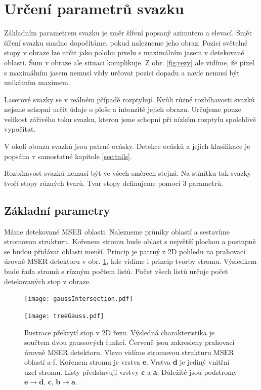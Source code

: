 \section{Určení parametrů svazku}
\label{sec:beam parameters}
Základním parametrem svazku je směr šíření popsaný azimutem a elevací. Směr šíření svazku snadno dopočítáme, pokud nalezneme jeho obraz. Pozici světelné stopy v obraze lze určit jako polohu pixelu s maximálním jasem v detekované oblasti. Šum v obraze ale situaci komplikuje. Z obr. \ref{fig:rezy} ale vidíme, že pixel s maximálním jasem nemusí vždy určovat pozici dopadu a navíc nemusí být unikátním maximem.

Laserové svazky se v reálném případě rozptylují. Kvůli různé rozbíhavosti svazků nejsme schopni určit údaje o ploše a intenzitě jejich obrazu. Určujeme pouze velikost zářivého toku svazku, kterou jsme schopni při nízkém rozptylu spolehlivě vypočítat.   

V okolí obrazu svazků jsou patrné ocásky. Detekce ocásků a jejich klasifikace je popsána v samostatné kapitole \ref{sec:tails}.

Rozbíhavost svazků nemusí být ve všech směrech stejná. Na stínítku tak svazky tvoří stopy různých tvarů. Tvar stopy definujeme pomocí 3 parametrů.

\subsection{Základní parametry}

Máme detekované MSER oblasti. Nalezneme průniky oblastí a sestavíme stromovou strukturu. Kořenem stromu bude oblast s největší plochou a postupně se budou přidávat oblasti menší. Princip je patrný z 2D pohledu na prahovací úrovně MSER detektoru v obr. \ref{fig:gaussIntersection}, kde vidíme i princip tvorby stromu. Výsledkem bude řada stromů s různým počtem listů. Počet všech listů určuje počet detekovaných stop v obraze.

\begin{figure}[htbp]
    \centering
	\begin{minipage}[c]{0.78 \textwidth}
    \texttt{[image: gaussIntersection.pdf]}
    \end{minipage}
    \begin{minipage}[c]{0.16 \textwidth}
    \texttt{[image: treeGauss.pdf]}
    \end{minipage}
    
    
     \caption[]{Ilustrace překrytí stop v 2D řezu. Výsledná charakteristika je součtem dvou gaussových funkcí. Červeně jsou zakresleny prahovací úrovně MSER detektoru. Vlevo vidíme stromovou strukturu MSER oblastí a-f. Kořenem stromu je vrstva \textbf{e}. Vrstva \textbf{d} je jediný vnitřní uzel stromu. Listy představují vrstvy \textbf{c} a \textbf{a}. Důležité jsou podstromy \textbf{e}$\rightarrow$\textbf{d}, \textbf{c}, \textbf{b}$\rightarrow$\textbf{a}.}
        \label{fig:gaussIntersection}
\end{figure}

